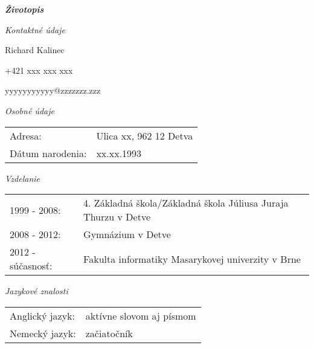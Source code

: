 \documentclass{article}
\begin{document}
\begin{center}
\Huge
\textbf{\textit{Životopis}}
\end{center}
\bigskip

\begin{flushleft}
\Large
\textit{\textsf{Kontaktné údaje}}
\normalsize
\end{flushleft}

\smallskip

Richard Kalinec

+421 xxx xxx xxx

yyyyyyyyyyy@zzzzzzz.zzz

\bigskip

\begin{flushleft}
\Large
\textit{\textsf{Osobné údaje}}
\normalsize
\end{flushleft}

\smallskip

\begin{adjustwidth}{-6pt}{}
\begin{tabular}{l l}
	Adresa: & Ulica xx, 962 12 Detva \\
	Dátum narodenia: & xx.xx.1993
\end{tabular}
\end{adjustwidth}

\bigskip

\begin{flushleft}
\Large
\textit{\textsf{Vzdelanie}}
\normalsize
\end{flushleft}

\smallskip

\begin{adjustwidth}{-6pt}{}
\begin{tabular}{l l}
	1999 - 2008: & 4. Základná škola/Základná škola Júliusa Juraja Thurzu v Detve\\
	2008 - 2012: & Gymnázium v Detve\\
	2012 - súčasnosť: & Fakulta informatiky Masarykovej univerzity v Brne\\
\end{tabular}
\end{adjustwidth}

\bigskip

\begin{flushleft}
\Large
\textit{\textsf{Jazykové znalosti}}
\normalsize
\end{flushleft}

\smallskip

\begin{adjustwidth}{-6pt}{}
\begin{tabular}{l l}
Anglický jazyk: & aktívne slovom aj písmom \\
Nemecký jazyk: & začiatočník
\end{tabular}
\end{adjustwidth}
\end{document}
